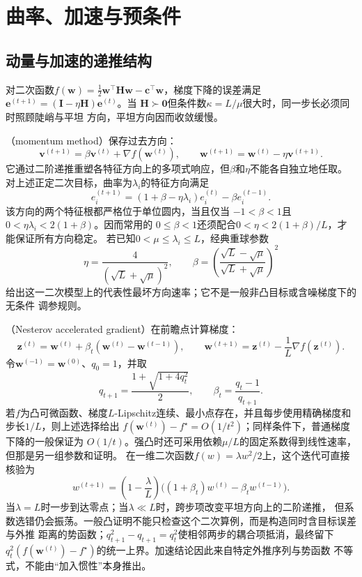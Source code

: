 \section{曲率、加速与预条件}
\label{sec:opt-curvature-acceleration}

\subsection{动量与加速的递推结构}

对二次函数$f(\bm{w})=\frac12\bm{w}^{\top}\bm{H}\bm{w}
-\bm{c}^{\top}\bm{w}$，梯度下降的误差满足
$\bm{e}^{(t+1)}=(\bm{I}-\eta\bm{H})\bm{e}^{(t)}$。当
$\bm{H}\succ\bm{0}$但条件数$\kappa=L/\mu$很大时，同一步长必须同时照顾陡峭与平坦
方向，平坦方向因而收敛缓慢。

（momentum method）保存过去方向：
\[
  \bm{v}^{(t+1)}=\beta\bm{v}^{(t)}+\nabla f(\bm{w}^{(t)}),
  \qquad
  \bm{w}^{(t+1)}=\bm{w}^{(t)}-\eta\bm{v}^{(t+1)}.
\]
它通过二阶递推重塑各特征方向上的多项式响应，但$\beta$和$\eta$不能各自独立地任取。
对上述正定二次目标，曲率为$\lambda_i$的特征方向满足
\[
  e_i^{(t+1)}
  =(1+\beta-\eta\lambda_i)e_i^{(t)}-\beta e_i^{(t-1)}.
\]
该方向的两个特征根都严格位于单位圆内，当且仅当
$-1<\beta<1$且$0<\eta\lambda_i<2(1+\beta)$。因而常用的
$0\leq\beta<1$还须配合$0<\eta<2(1+\beta)/L$，才能保证所有方向稳定。
若已知$0<\mu\leq\lambda_i\leq L$，经典重球参数
\[
  \eta=\frac{4}{(\sqrt{L}+\sqrt{\mu})^2},
  \qquad
  \beta=\left(\frac{\sqrt{L}-\sqrt{\mu}}
  {\sqrt{L}+\sqrt{\mu}}\right)^2
\]
给出这一二次模型上的代表性最坏方向速率；它不是一般非凸目标或含噪梯度下的无条件
调参规则。

（Nesterov accelerated gradient）在前瞻点计算梯度：
\[
  \bm{z}^{(t)}=\bm{w}^{(t)}+\beta_t(\bm{w}^{(t)}-\bm{w}^{(t-1)}),
  \qquad
  \bm{w}^{(t+1)}=\bm{z}^{(t)}-\frac1L\nabla f(\bm{z}^{(t)}).
\]
令$\bm{w}^{(-1)}=\bm{w}^{(0)}$、$q_0=1$，并取
\[
  q_{t+1}=\frac{1+\sqrt{1+4q_t^2}}{2},
  \qquad
  \beta_t=\frac{q_t-1}{q_{t+1}}.
\]
若$f$为凸可微函数、梯度$L$-Lipschitz连续、最小点存在，并且每步使用精确梯度和
步长$1/L$，则上述选择给出
$f(\bm{w}^{(t)})-f^\star=O(1/t^2)$；同样条件下，普通梯度下降的一般保证为
$O(1/t)$。强凸时还可采用依赖$\mu/L$的固定系数得到线性速率，但那是另一组参数和证明。
在一维二次函数$f(w)=\lambda w^2/2$上，这个迭代可直接核验为
\[
  w^{(t+1)}
  =\left(1-\frac{\lambda}{L}\right)
  \bigl((1+\beta_t)w^{(t)}-\beta_t w^{(t-1)}\bigr).
\]
当$\lambda=L$时一步到达零点；当$\lambda\ll L$时，跨步项改变平坦方向上的二阶递推，
但系数选错仍会振荡。一般凸证明不能只检查这个二次算例，而是构造同时含目标误差与外推
距离的势函数；$q_{t+1}^2-q_{t+1}=q_t^2$使相邻两步的耦合项抵消，最终留下
$q_t^2(f(\bm{w}^{(t)})-f^\star)$的统一上界。加速结论因此来自特定外推序列与势函数
不等式，不能由“加入惯性”本身推出。

